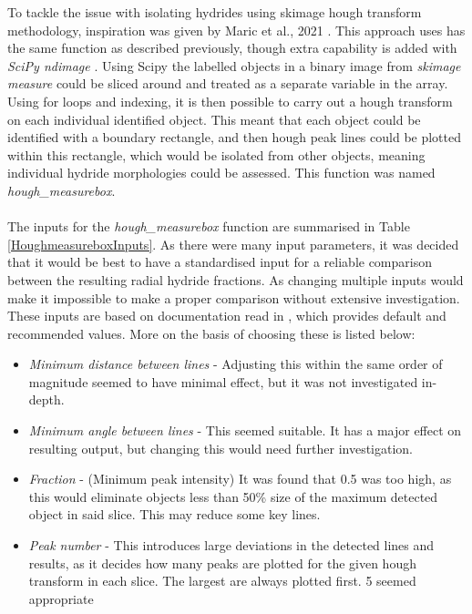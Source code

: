 \documentclass{article}
\begin{document}
    
    To tackle the issue with isolating hydrides using skimage hough transform methodology, inspiration was given by Maric et al., 2021 \cite{Maric2021}. This approach uses has the same function as  described previously, though extra capability is added with \textit{SciPy ndimage} \cite{Scipy2021}. Using Scipy the labelled objects in a binary image from \textit{skimage measure} could be sliced around and treated as a separate variable in the array. Using for loops and indexing, it is then possible to carry out a hough transform on each individual identified object. This meant that each object could be identified with a boundary rectangle, and then hough peak lines could be plotted within this rectangle, which would be isolated from other objects, meaning individual hydride morphologies could be assessed. This function was named \textit{hough\_measurebox}.
    \\
    \\
    The inputs for the \textit{hough\_measurebox} function are summarised in Table \ref{HoughmeasureboxInputs}. As there were many input parameters, it was decided that it would be best to have a standardised input for a reliable comparison between the resulting radial hydride fractions. As changing multiple inputs would make it impossible to make a proper comparison without extensive investigation. These inputs are based on documentation read in \cite{ScikitimageB}, which provides default and recommended values. More on the basis of choosing these is listed below:

    \begin{itemize}
        \item \textit{Minimum distance between lines} - Adjusting this within the same order of magnitude seemed to have minimal effect, but it was not investigated in-depth.

        \item \textit{Minimum angle between lines} - This seemed suitable. It has a major effect on resulting output, but changing this would need further investigation.

        \item \textit{Fraction} - (Minimum peak intensity) It was found that 0.5 was too high, as this would eliminate objects less than 50\% size of the maximum detected object in said slice. This may reduce some key lines.

        \item \textit{Peak number} - This introduces large deviations in the detected lines and results, as it decides how many peaks are plotted for the given hough transform in each slice. The largest are always plotted first. 5 seemed appropriate
    \end{itemize}
\end{document}
